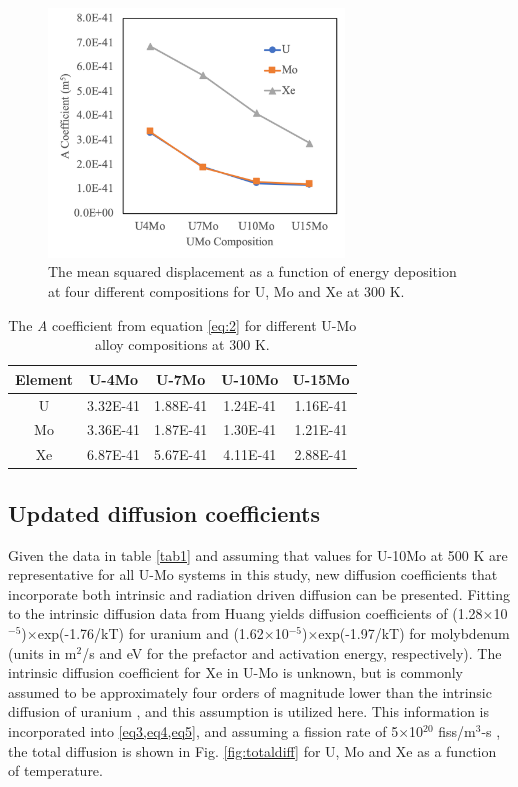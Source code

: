 \documentclass[review]{elsarticle}
\begin{document}
\begin{figure}[h]
 \centering
 \includegraphics[width=0.7\textwidth]{A_comp.png} 
 \caption{The mean squared displacement as a function of energy deposition at four different compositions for U, Mo and Xe at 300 K.}
 \label{fig:A_comp}
\end{figure}

\begin{table}[h!]
\caption{The \textit{A} coefficient from equation \ref{eq:2} for different U-Mo alloy compositions at 300 K. }
\label{tab1}
\begin{center}
\begin{tabular}{|c|c|c|c|c|}
     \hline
Element & U-4Mo & U-7Mo & U-10Mo & U-15Mo  \\
\hline
U & 3.32E-41 & 1.88E-41 &  1.24E-41 & 1.16E-41 \\
Mo & 3.36E-41 & 1.87E-41 & 1.30E-41 & 1.21E-41 \\
Xe & 6.87E-41 &  5.67E-41 & 4.11E-41 & 2.88E-41  \\
 \hline
\end{tabular}
\end{center}
\label{default}
\end{table}%


\subsection{Updated diffusion coefficients}

Given the data in table \ref{tab1} and assuming that values for U-10Mo at 500 K are representative for all U-Mo systems in this study, new diffusion coefficients that incorporate both intrinsic and radiation driven diffusion can be presented. Fitting to the intrinsic diffusion data from Huang \cite{huang2013} yields diffusion coefficients of (1.28$\times$10$^{-5}$)$\times$exp(-1.76/kT) for uranium and (1.62$\times$10$^{-5}$)$\times$exp(-1.97/kT) for molybdenum (units in m$^2$/s and eV for the prefactor and activation energy, respectively). The intrinsic diffusion coefficient for Xe in U-Mo is unknown, but is commonly assumed to be approximately four orders of magnitude lower than the intrinsic diffusion of uranium \cite{hu2016a, ushprr17, ushprr18}, and this assumption is utilized here. This information is incorporated into \cref{eq3,eq4,eq5}, and assuming a fission rate of 5$\times$10$^{20}$ fiss/m$^3$-s \cite{ushprr17, ushprr18}, the total diffusion is shown in Fig. \ref{fig:totaldiff} for U, Mo and Xe as a function of temperature. 
\end{document}
